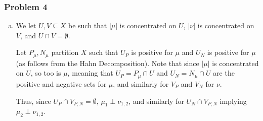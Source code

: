\documentclass[10pt]{mypackage}
\begin{document}
\subsubsection{Problem 4}%
\begin{enumerate}[(a)]
  \item We let $U,V\subseteq X$ be such that $\left\vert \mu \right\vert$ is concentrated on $U$, $\left\vert \nu \right\vert$ is concentrated on $V$, and $U\cap V = \emptyset$.\newline

    Let $P_{\mu},N_{\mu}$ partition $X$ such that $U_P$ is positive for $\mu$ and $U_N$ is positive for $\mu$ (as follows from the Hahn Decomposition). Note that since $\left\vert \mu \right\vert$ is concentrated on $U$, so too is $\mu$, meaning that $U_P = P_{\mu}\cap U$ and $U_N = N_{\mu}\cap U$ are the positive and negative sets for $\mu$, and similarly for $V_P$ and $V_N$ for $\nu$.\newline

    Thus, since $U_P\cap V_{P,N} = \emptyset$, $\mu_1\perp \nu_{1,2}$, and similarly for $U_N\cap V_{P,N}$ implying $\mu_2\perp \nu_{1,2}$.
\end{enumerate}
\end{document}
